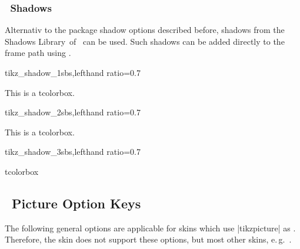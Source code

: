 \clearpage
\subsubsection{\tikzname\ Shadows}
Alternativ to the package shadow options described before, shadows from
the \flqq Shadows Library\frqq\ of \tikzname\ can be used.
Such shadows can be added directly to the frame path using .

\begin{exdispExample*}{tikz_shadow_1}{sbs,lefthand ratio=0.7}
\begin{tcolorbox}[enhanced,
  colback=red!5!white,colframe=red!75!black,
  frame style={drop shadow} ]
  This is a tcolorbox.
\end{tcolorbox}
\end{exdispExample*}

\begin{exdispExample*}{tikz_shadow_2}{sbs,lefthand ratio=0.7}
\begin{tcolorbox}[enhanced,height=3cm,
  colback=red!5!white,colframe=red!75!black,
  halign=center,valign=center,
  frame style={circular drop shadow} ]
  This is a tcolorbox.
\end{tcolorbox}
\end{exdispExample*}

\begin{exdispExample*}{tikz_shadow_3}{sbs,lefthand ratio=0.7}
\begin{tcolorbox}[enhanced,width=2.5cm,
  square,circular arc,
  halign=center,valign=center,
  colback=red!5!white,colframe=red!75!black,
  frame style={circular glow={fill=red}} ]
  tcolorbox
\end{tcolorbox}
\end{exdispExample*}


\clearpage
\subsection{\tikzname\  Picture Option Keys}\label{subsec:tikzpicture}
The following general options are applicable for skins which
use |tikzpicture| as .
Therefore, the skin  does not support these options,
but most other skins, e.\,g.\ .


